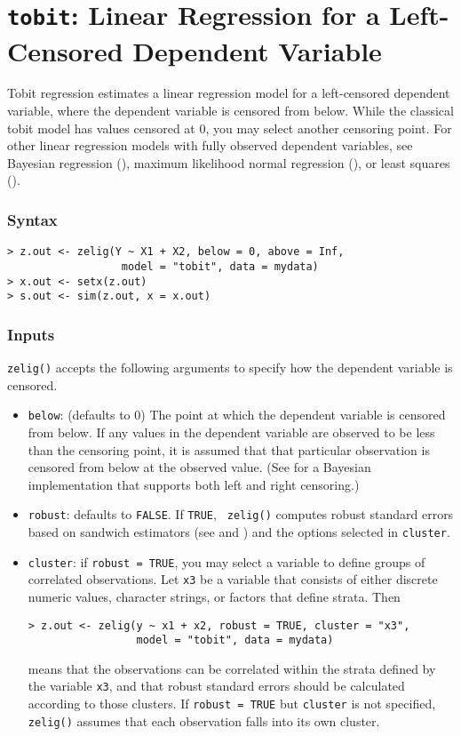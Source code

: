 \section{\texttt{tobit}: Linear Regression for a
Left-Censored Dependent Variable} \label{tobit}

Tobit regression estimates a linear regression model for a
left-censored dependent variable, where the dependent variable is
censored from below.  While the classical tobit model has values
censored at 0, you may select another censoring point.  For other
linear regression models with fully observed dependent variables, see
Bayesian regression (), maximum likelihood normal
regression (), or least squares ().

\subsubsection{Syntax}
\begin{verbatim}
> z.out <- zelig(Y ~ X1 + X2, below = 0, above = Inf, 
                  model = "tobit", data = mydata)
> x.out <- setx(z.out)
> s.out <- sim(z.out, x = x.out)
\end{verbatim}

\subsubsection{Inputs}
{\tt zelig()} accepts the following arguments to specify how the
dependent variable is censored.
\begin{itemize}
\item \texttt{below}: (defaults to 0)  The point at which the dependent
variable is censored from below.  If any values in the dependent
variable are observed to be less than the censoring point, it is
assumed that that particular observation is censored from below at the
observed value.  (See  for a Bayesian
implementation that supports both left and right censoring.) 
 \item {\tt robust}: defaults to {\tt FALSE}.  If {\tt TRUE}, {\tt
zelig()} computes robust standard errors based on sandwich estimators
(see \cite{Huber81} and \cite{White80}) and the options selected in
{\tt cluster}.
\item {\tt cluster}:  if {\tt robust = TRUE}, you may select a
variable to define groups of correlated observations.  Let {\tt x3} be
a variable that consists of either discrete numeric values, character
strings, or factors that define strata.  Then
\begin{verbatim}
> z.out <- zelig(y ~ x1 + x2, robust = TRUE, cluster = "x3", 
                 model = "tobit", data = mydata)
\end{verbatim}
means that the observations can be correlated within the strata defined by
the variable {\tt x3}, and that robust standard errors should be
calculated according to those clusters.  If {\tt robust = TRUE} but
{\tt cluster} is not specified, {\tt zelig()} assumes that each
observation falls into its own cluster.  
\end{itemize}

